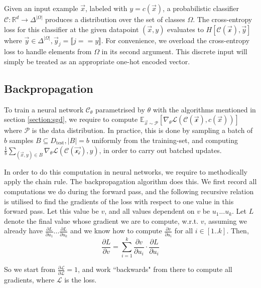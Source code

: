 \documentclass{ociamthesis}
\begin{document}
Given an input example $\vec{x}$, labeled with $y=c(\vec{x})$, a probabilistic
classifier $\mathcal{C}: \mathbb{R}^d \to \Delta^{|\Omega|}$ produces a
distribution over the set of classes $\Omega$. The cross-entropy loss for this
classifier at the given datapoint $(\vec{x}, y)$ evaluates to
$H[\mathcal{C(\mathcal{\vec{x}})}, \vec{y}]$ where $\vec{y} \in
\Delta^{|\Omega|}, \vec{y}_j=\llbracket j == y \rrbracket$. For convenience, we
overload the cross-entropy loss to handle elements from $\Omega$ in its second
argument. This discrete input will simply be treated as an appropriate one-hot
encoded vector.

\subsection{Backpropagation}
To train a neural network $\mathcal{C}_\theta$ parametrised by $\theta$ with the
algorithms mentioned in section \ref{section:sgd}, we require to compute
$\mathbb{E}_{\vec{x} \sim \mathcal{P}}[\nabla_\theta
\mathcal{L}(\mathcal{C(\vec{x})}, c(\vec{x}))]$ where $\mathcal{P}$ is the data
distribution. In practice, this is done by sampling a batch of $b$ samples $B
\subseteq D_\text{test}, |B|=b$ uniformly from the training-set, and computing
$\frac{1}{b} \sum_{(\vec{x}, y) \in B} \nabla_\theta
\mathcal{L}(\mathcal{C(\vec{x_i})}, y)$, in order to carry out batched updates.

In order to do this computation in neural networks, we require to methodically
apply the chain rule. The backpropagation algorithm does this. We first record
all computations we do during the forward pass, and the following recursive
relation is utilised to find the gradients of the loss with respect to one value
in this forward pass. Let this value be $v$, and all values dependent on $v$ be
$u_1... u_k$. Let $L$ denote the final value whose gradient we are to compute,
w.r.t. $v$, assuming we already have $\frac{\partial L}{\partial u_1}...
\frac{\partial L}{\partial u_k}$ and we know how to compute $\frac{\partial
v}{\partial u_i}$ for all $i\in [1..k]$. Then,
\begin{equation*}
    \frac{\partial L}{\partial v} = \sum_{i=1}^k {\frac{\partial
v}{\partial u_i}\cdot \frac{\partial L}{\partial u_i}}
\end{equation*}

So we start from $\frac{\partial \mathcal{L}}{\partial \mathcal{L}}=1$, and work
``backwards" from there to compute all gradients, where $\mathcal{L}$ is the
loss.
\end{document}
